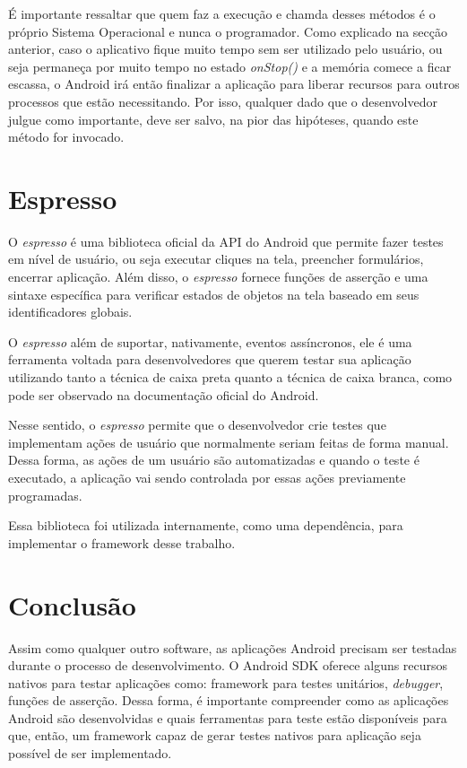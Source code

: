 \documentclass[
    12pt,       %
    openright,      %
    twoside,      %
    a4paper,      %
    english,      %
    french,       %
    spanish,      %
    brazil,       %
    ]{abntex2}
\begin{document}
        É importante ressaltar que quem faz a execução e chamda desses métodos é o próprio Sistema
        Operacional e nunca o programador. Como explicado na secção anterior, caso o aplicativo
        fique muito tempo sem ser utilizado pelo usuário, ou seja permaneça por muito tempo no
        estado \textit{onStop()} e a memória comece a ficar escassa, o Android irá então finalizar
        a aplicação para liberar recursos para outros processos que estão necessitando. Por
        isso, qualquer dado que o desenvolvedor julgue como importante, deve ser salvo, na pior das
        hipóteses, quando este método for invocado.

      \section{Espresso}
        O \textit{espresso} é uma biblioteca oficial da API do Android que permite fazer testes em nível
        de usuário, ou seja executar cliques na tela, preencher formulários, encerrar aplicação. Além
        disso, o \textit{espresso} fornece funções de asserção e uma sintaxe específica para verificar
        estados de objetos na tela baseado em seus identificadores globais.

        O \textit{espresso} além de suportar, nativamente, eventos assíncronos, ele é uma ferramenta voltada
        para desenvolvedores que querem testar sua aplicação utilizando tanto a técnica de caixa preta
        quanto a técnica de caixa branca, como pode ser observado na documentação oficial do Android.

        Nesse sentido, o \textit{espresso} permite que o desenvolvedor crie testes que implementam
        ações de usuário que normalmente seriam feitas de forma manual. Dessa forma, as ações de um usuário
        são automatizadas e quando o teste é executado, a aplicação vai sendo controlada por essas ações
        previamente programadas.

        Essa biblioteca foi utilizada internamente, como uma dependência, para implementar o framework desse
        trabalho.

      \section{Conclusão}
        Assim como qualquer outro software, as aplicações Android precisam ser testadas durante o
        processo de desenvolvimento. O Android SDK oferece alguns recursos nativos para testar aplicações
        como: framework para testes unitários, \textit{debugger}, funções de asserção. Dessa forma, é
        importante compreender como as aplicações Android são desenvolvidas e quais ferramentas para teste
        estão disponíveis para que, então, um framework capaz de gerar testes nativos para aplicação seja
        possível de ser implementado.
\end{document}
